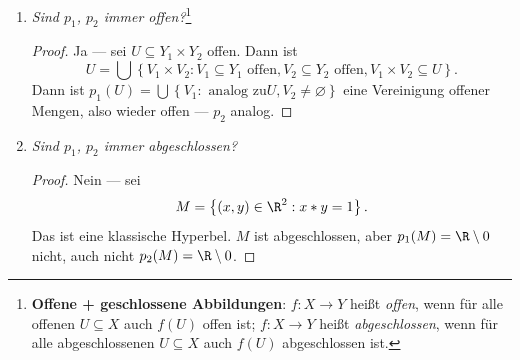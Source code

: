 \begin{problem*}[2]
\begin{enumerate}
    \item \emph{Sind \( p_1 \), \( p_2 \) immer offen?}\footnote{\textbf{Offene + geschlossene Abbildungen}: \( f: X \to Y \) heißt \emph{offen}, wenn für alle offenen \( U \subseteq X \) auch \( f(U) \) offen ist; \( f: X \to Y \) heißt \emph{abgeschlossen}, wenn für alle abgeschlossenen \( U \subseteq X \) auch \( f(U) \) abgeschlossen ist.}
    
    \begin{proof}
      Ja --- sei \( U \subseteq Y_1 \times Y_2 \) offen. Dann ist
      \begin{equation*}
        U = \bigcup\left \{ V_1 \times V_2 : V_1 \subseteq Y_1 \text{ offen}, V_2 \subseteq Y_2 \text{ offen}, V_1 \times V_2 \subseteq U \right \} \text{.}
      \end{equation*}
      Dann ist \( p_1(U) = \bigcup\left \{ V_1 : \text{ analog zu} U, V_2 \neq \varnothing \right \} \) eine Vereinigung offener Mengen, also wieder offen --- \( p_2 \) analog.
    \end{proof}
    
    \item \emph{Sind \( p_1 \), \( p_2 \) immer abgeschlossen?}
    
    \begin{proof}
      Nein --- sei
      \begin{equation*}
        M = \left \{ (x,y) \in \R^2 : x*y = 1 \right \} \text{.}
      \end{equation*}
      Das ist eine klassische Hyperbel. \( M \) ist abgeschlossen, aber \( p_1(M) = \R \setminus { 0} \) nicht, auch nicht \( p_2(M) = \R \setminus { 0} \).
    \end{proof}
  \end{enumerate}
\end{problem*}

